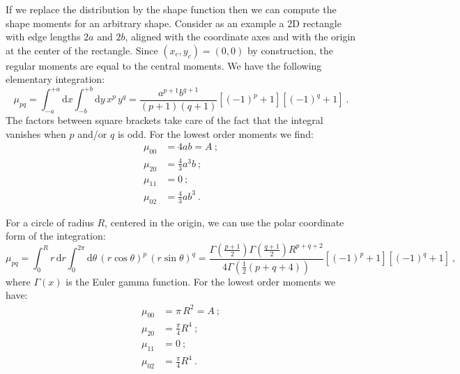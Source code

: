 If we replace the distribution by the shape function then we can compute the shape moments for an arbitrary shape.  Consider as an example a 2D rectangle with edge lengths $2a$ and $2b$, aligned with the coordinate axes and with the origin at the center of the rectangle. Since $(x_c,y_c)=(0,0)$ by construction, the regular moments are equal to the central moments. We have the following elementary integration:
\[
	\mu_{pq} = \int_{-a}^{+a}\!\!\!\mathrm{d}x \int_{-b}^{+b}\!\!\!\mathrm{d}y\,x^p\,y^q = \frac{a^{p+1}b^{q+1}}{(p+1)(q+1)}[(-1)^p+1][(-1)^q+1]\ .
\]	
The factors between square brackets take care of the fact that the integral vanishes when $p$ and/or $q$ is odd.  For the lowest order moments we find:
\begin{equation}
	\begin{split}
		\mu_{00} &= 4ab = A\ ;\\
		\mu_{20} &= \frac{4}{3}a^3b\ ;\\
		\mu_{11} &= 0\ ;\\
		\mu_{02} &= \frac{4}{3}ab^3\ .
	\end{split}
\end{equation}

For a circle of radius $R$, centered in the origin, we can use the polar coordinate form of the integration:
\[
	\mu_{pq} = \int_{0}^{R}\!\!\!r\,\mathrm{d}r \int_{0}^{2\pi}\!\!\!\mathrm{d}\theta\,(r\cos\theta)^p\,(r\sin\theta)^q = \frac{\Gamma \left(\frac{p+1}{2}\right) \Gamma \left(\frac{q+1}{2}\right) R^{p+q+2}}{4 \Gamma \left(\frac{1}{2} (p+q+4)\right)}[(-1)^p+1][(-1)^q+1]\ ,
\]	
where $\Gamma(x)$ is the Euler gamma function.  For the lowest order moments we have:
\begin{equation}
	\begin{split}
		\mu_{00} &= \pi\,R^2 = A\ ;\\
		\mu_{20} &= \frac{\pi}{4}R^4\ ;\\
		\mu_{11} &= 0\ ;\\
		\mu_{02} &= \frac{\pi}{4}R^4\ .
	\end{split}
\end{equation}


